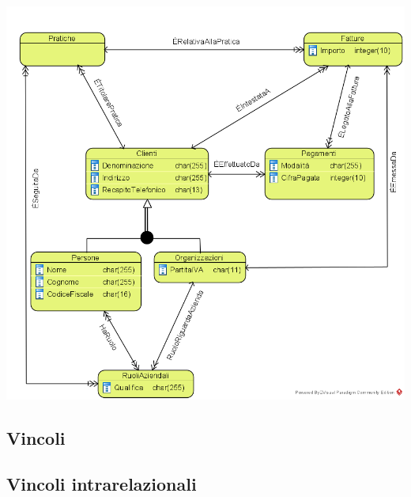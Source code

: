 \documentclass[a4paper,12pt]{article}
\begin{document}
\begin{minipage}{\textwidth}
\begin{center}
\centering 
\centerline{
\includegraphics[width=\textwidth]{ Schema concettuale a oggetti.png }
}
\end{center}
\end{minipage}

 \subsection{ Vincoli }

\subsection{ Vincoli intrarelazionali }
\end{document}
